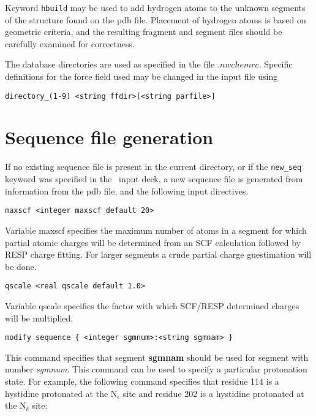 Keyword \verb+hbuild+ may be used to add hydrogen atoms to the
unknown segments of the structure found on the pdb file. Placement
of hydrogen atoms is based on geometric criteria, and the resulting
fragment and segment files should be carefully examined for correctness.

The database directories are used as specified in the file $.nwchemrc$. Specific
definitions for the force field used may be changed in the input file using

\begin{verbatim}
directory_(1-9) <string ffdir>[<string parfile>]
\end{verbatim}

\section{Sequence file generation}

If no existing sequence file is present in the current directory,
or if the \verb+new_seq+ keyword was specified in the \prepare\ 
input deck, a new sequence file is generated from information
from the pdb file, and the following input directives.

\begin{verbatim}
maxscf <integer maxscf default 20>
\end{verbatim}

Variable maxscf specifies the maximum number of atoms in a segment for
which partial atomic charges will be determined from an SCF calculation
followed by RESP charge fitting. For larger segments a crude partial
charge guestimation will be done.

\begin{verbatim}
qscale <real qscale default 1.0>
\end{verbatim}

Variable qscale specifies the factor with which SCF/RESP determined
charges will be multiplied.

\begin{verbatim}
modify sequence { <integer sgmnum>:<string sgmnam> }
\end{verbatim}

This command specifies that segment {\bf sgmnam} should be used
for segment with number {\it sgmnum}. This command can be used
to specify a particular protonation state. For example, the
following command specifies that residue 114 is a hystidine
protonated at the N$_\epsilon$ site and residue 202 is a hystidine
protonated at the N$_\delta$ site:

